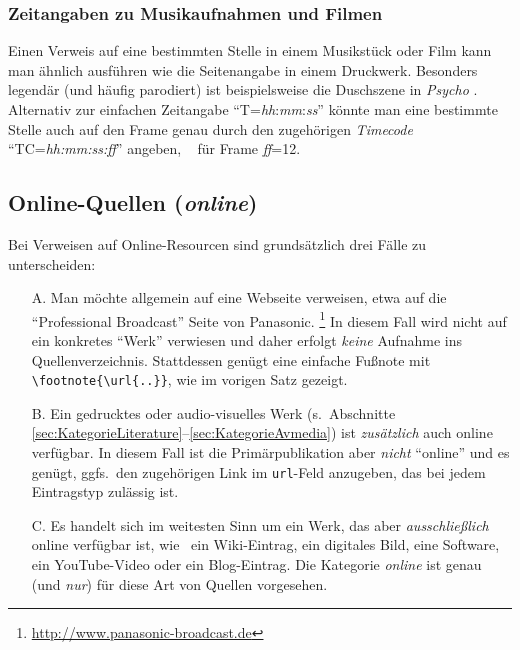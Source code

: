 \subsubsection{Zeitangaben zu Musikaufnahmen und Filmen} 

Einen Verweis auf eine bestimmten Stelle in einem Musikstück oder Film kann man 
ähnlich ausführen wie die Seitenangabe in einem Druckwerk.
Besonders legendär (und häufig parodiert) ist beispielsweise die Duschszene
in \emph{Psycho} \cite[T=00:32:10]{Psycho}.
Alternativ zur einfachen Zeitangabe "`T=\emph{hh}:\emph{mm}:\emph{ss}"' 
könnte man eine bestimmte Stelle auch auf den Frame genau durch 
den zugehörigen \emph{Timecode} "`TC=\emph{hh:mm:ss:ff}"' angeben, 
\zB\ \cite[TC=00:32:10:12]{Psycho} für Frame \emph{ff}=12.



\subsection{Online-Quellen (\emph{online})}
\label{sec:KategorieOnline}

Bei Verweisen auf Online-Resourcen sind grundsätzlich drei Fälle zu unterscheiden:
%
\begin{itemize}
\item[A.] Man möchte allgemein auf eine Webseite verweisen, etwa auf die 
	"`Professional Broadcast"' Seite von Panasonic.%
	\footnote{\url{http://www.panasonic-broadcast.de}}
	In diesem Fall wird nicht auf ein konkretes "`Werk"' verwiesen und daher
	erfolgt \emph{keine} Aufnahme ins Quellenverzeichnis. Stattdessen
	genügt eine einfache Fußnote mit \verb!\footnote{\url{..}}!, wie im vorigen
	Satz gezeigt.
\item[B.] Ein gedrucktes oder audio-visuelles Werk 
	(s.\ Abschnitte \ref{sec:KategorieLiterature}--\ref{sec:KategorieAvmedia})
	ist \emph{zusätzlich} auch online verfügbar. In diesem Fall ist die Primär\-publikation 
	aber \emph{nicht} "`online"' und es genügt, ggfs.\ den zugehörigen Link im 
	\texttt{url}-Feld anzugeben, das bei jedem Eintragstyp zulässig ist.
\item[C.] Es handelt sich im weitesten Sinn um ein Werk, das aber 
	\emph{ausschließlich} online verfügbar ist, wie \zB\ ein Wiki-Eintrag, 
	ein digitales Bild,	eine Software, ein YouTube-Video oder ein Blog-Eintrag.
	Die Kategorie \emph{online} ist genau (und \emph{nur}) für diese 
	Art von Quellen vorgesehen.
\end{itemize}




